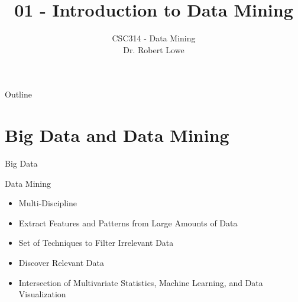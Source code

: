 \documentclass[]{beamer}
\title{01 - Introduction to Data Mining}
\author{CSC314 - Data Mining\\\vspace{1cm} Dr. Robert Lowe\\}
\institute[Maryville College] %
{
  Division of Mathematics and Computer Science\\
  Maryville College
}
\date[]{}
\begin{document}
\begin{frame}
  \titlepage
\end{frame}

\begin{frame}{Outline}
  \tableofcontents
\end{frame}





\section{Big Data and Data Mining}

\begin{frame}{Big Data}
\end{frame}

\begin{frame}{Data Mining}
    \begin{itemize}[<+->]
        \item Multi-Discipline
        \item Extract Features and Patterns from Large Amounts of Data
        \item Set of Techniques to Filter Irrelevant Data
        \item Discover Relevant Data
        \item Intersection of Multivariate Statistics, Machine
            Learning, and Data Visualization
    \end{itemize}
\end{frame}
\end{document}
